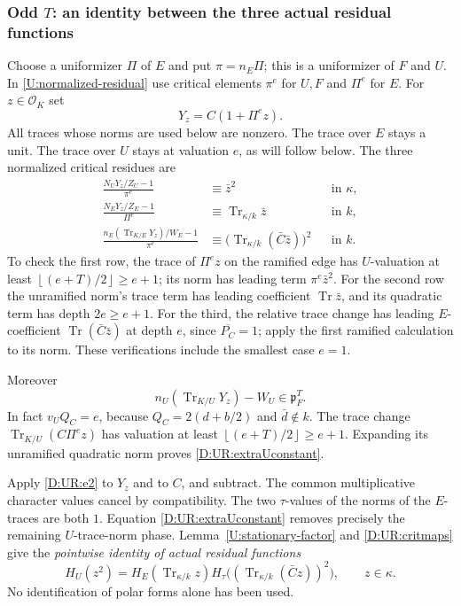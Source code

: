 \documentclass[11pt]{amsart}
\theoremstyle{definition}
\theoremstyle{remark}
\newcommand{\Tr}{\operatorname{Tr}}
\newcommand{\floor}[1]{\left\lfloor #1\right\rfloor}
\newcommand{\OO}{\mathcal O}\newcommand{\pp}{\mathfrak p}\newcommand{\PP}{\mathfrak P}
\begin{document}
\subsubsection*{Odd \texorpdfstring{$T$}{T}: an identity between the three actual residual functions}
Choose a uniformizer $\Pi$ of $E$ and put $\pi=n_E\Pi$; this is a
uniformizer of $F$ and $U$. In \eqref{U:normalized-residual} use critical elements
$\pi^e$ for $U,F$ and $\Pi^e$ for $E$.
For $z\in\OO_K$ set
\[
 Y_z=C(1+\Pi^e z).
\]
All traces whose norms are used below are nonzero. The trace over $E$ stays
a unit. The trace over $U$ stays at valuation $e$, as will follow below.
The three normalized critical residues are
\begin{equation}\label{D:UR:critmaps}
 \begin{aligned}
 \frac{N_UY_z/Z_U-1}{\pi^e}&\equiv\bar z^2 &&\text{in }\kappa,\\
 \frac{N_EY_z/Z_E-1}{\Pi^e}&\equiv\Tr_{\kappa/k}\bar z &&\text{in }k,\\
 \frac{n_E(\Tr_{K/E}Y_z)/W_E-1}{\pi^e}
    &\equiv\bigl(\Tr_{\kappa/k}(\bar C\bar z)\bigr)^2 &&\text{in }k.
 \end{aligned}
\end{equation}
To check the first row, the trace of $\Pi^ez$ on the ramified edge has
$U$-valuation at least $\floor{(e+T)/2}\ge e+1$; its norm has leading
term $\pi^e\bar z^2$. For the second row the unramified norm's trace term
has leading coefficient $\Tr\bar z$, and its quadratic term has depth
$2e\ge e+1$. For the third, the relative trace change has leading
$E$-coefficient $\Tr(\bar C\bar z)$ at depth $e$, since
$\overline{P_C}=1$; apply the first ramified calculation to its norm.
These verifications include the smallest case $e=1$.

Moreover
\begin{equation}\label{D:UR:extraUconstant}
 n_U(\Tr_{K/U}Y_z)-W_U\in\pp_F^T.
\end{equation}
In fact $v_UQ_C=e$, because $Q_C=2(d+b/2)$ and $\bar d\notin k$.
The trace change $\Tr_{K/U}(C\Pi^ez)$ has valuation at least
$\floor{(e+T)/2}\ge e+1$. Expanding its unramified quadratic norm proves
\eqref{D:UR:extraUconstant}.

Apply \eqref{D:UR:e2} to $Y_z$ and to $C$, and subtract. The common
multiplicative character values cancel by compatibility. The two
$\tau$-values of the norms of the $E$-traces are both $1$.
Equation \eqref{D:UR:extraUconstant} removes precisely the remaining
$U$-trace-norm phase. Lemma~\ref{U:stationary-factor} and \eqref{D:UR:critmaps} give the
\emph{pointwise identity of actual residual functions}
\begin{equation}\label{D:UR:actualHidentity}
 H_U(z^2)=H_E(\Tr_{\kappa/k}z)
           H_\tau\bigl((\Tr_{\kappa/k}(\bar C z))^2\bigr),
 \qquad z\in\kappa.
\end{equation}
No identification of polar forms alone has been used.
\end{document}
